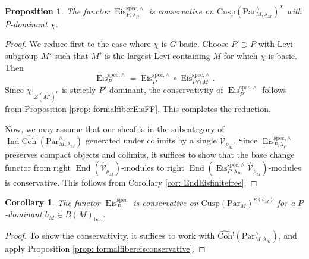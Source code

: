 \documentclass{amsart}
\newtheorem{proposition}[theorem]{Proposition}
\newtheorem{corollary}[theorem]{Corollary}
\theoremstyle{definition}
\theoremstyle{remark}
\numberwithin{equation}{section}
\DeclareMathOperator{\Ind}{Ind}
\newcommand{\mc}{\mathcal}
\newcommand{\bas}{\mathrm{bas}}
\newcommand{\spec}{\mathrm{spec}}
\DeclareMathOperator{\End}{End}
\newcommand{\wh}{\widehat}
\newcommand{\Par}{\mathrm{Par}}
\DeclareMathOperator{\Eis}{\mathrm{Eis}}
\newcommand{\Coh}{\mathrm{Coh}}
\newcommand{\Cusp}{\mathrm{Cusp}}
\begin{document}
\begin{proposition}{\label{prop: formalfibereisconservative}}
The functor $\Eis^{\spec,\wedge}_{P,\lambda_P}$ is conservative on $\Cusp(\Par_{M,\lambda_M}^\wedge)^{\chi}$ with $P$-dominant $\chi$. 
\end{proposition}
    
\begin{proof}
We reduce first to the case where $\chi$ is $G$-basic. Choose $P' \supset P$ with Levi subgroup $M'$ such that $M'$ is the largest Levi containing $M$ for which $\chi$ is basic. Then 
\begin{equation*}
    \Eis^{\spec,\wedge}_P = \Eis^{\spec,\wedge}_{P'} \circ \Eis^{\spec,\wedge}_{P \cap M'}.
\end{equation*}
Since $\chi|_{Z(\wh{M'})^{\Gamma}}$ is strictly $P'$-dominant, the conservativity of $\Eis_{P'}^{\spec,\wedge}$ follows from Proposition \ref{prop: formalfiberEisFF}. This completes the reduction.

Now, we may assume that our sheaf is in the subcategory of $\Ind\wh{\Coh}{}^!(\Par_{M,\lambda_M}^\wedge)$ generated under colimits by a single $\wh{\mc V}_{\rho_M}$. Since $\Eis^{\spec,\wedge}_{P,\lambda_P}$ preserves compact objects and colimits, it suffices to show that the base change functor from right $\End(\wh{\mc V}_{\rho_M})$-modules to right $\End(\Eis^{\spec,\wedge}_{P,\lambda_P}\wh{\mc V}_{\rho_M})$-modules is conservative. This follows from Corollary \ref{cor: EndEisfinitefree}.     
\end{proof}

\begin{corollary}{\label{cor: ParGEisconservativity}}
The functor $\Eis^\spec _P$ is conservative on $\Cusp(\Par_M)^{\kappa (b_M)}$ for a $P$-dominant $b_M\in B(M)_\bas$. 
\end{corollary}

\begin{proof}
To show the conservativity, it suffices to work with $\wh{\Coh}{}^!(\Par_{M,\lambda_M}^\wedge)$, and apply Proposition \ref{prop: formalfibereisconservative}. 
\end{proof}

\printbibliography
\end{document}
